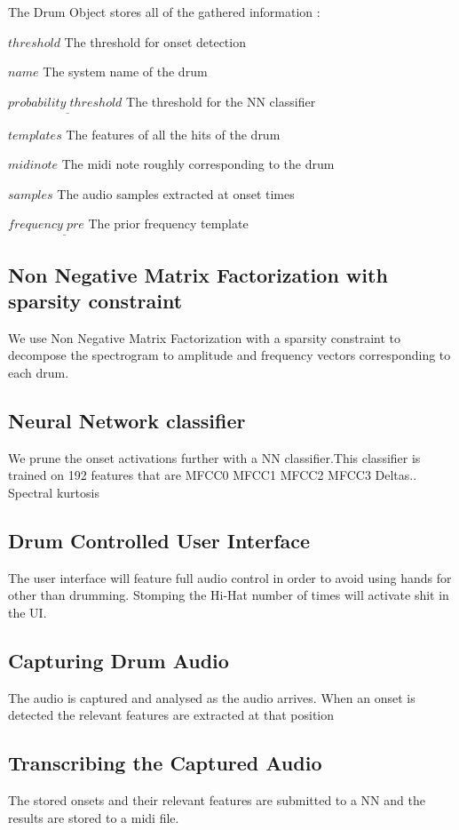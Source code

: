 \documentclass[10pt]{article}
\begin{document}
The Drum Object stores all of the gathered information :
\begin{center}

\item[$threshold$] The threshold for onset detection
\item[$name$] The system name of the drum
\item[$probability_\_threshold$] The threshold for the NN classifier
\item[$templates$] The features of all the hits of the drum
\item[$midinote$] The midi note roughly corresponding to the drum
\item[$samples$]The audio samples extracted at onset times
\item[$frequency_\_pre$]The prior frequency template

\end{center}

\subsection{Non Negative Matrix Factorization with sparsity constraint}
We use Non Negative Matrix Factorization with a sparsity constraint to decompose the spectrogram to amplitude and frequency vectors corresponding to each drum.

\subsection{Neural Network classifier}
We prune the onset activations further with a NN classifier.This classifier is trained on 192 features that are MFCC0 MFCC1 MFCC2 MFCC3 Deltas..
Spectral kurtosis

\subsection{Drum Controlled User Interface}
The user interface will feature full audio control in order to avoid using hands for other than drumming. Stomping the Hi-Hat number of times will activate shit in the UI.
\subsection{Capturing Drum Audio}
The audio is captured and analysed as the audio arrives. When an onset is detected the relevant features are extracted at that position
\subsection{Transcribing the Captured Audio}
The stored onsets and their relevant features are submitted to a NN and the results are stored to a midi file.
\end{document}
